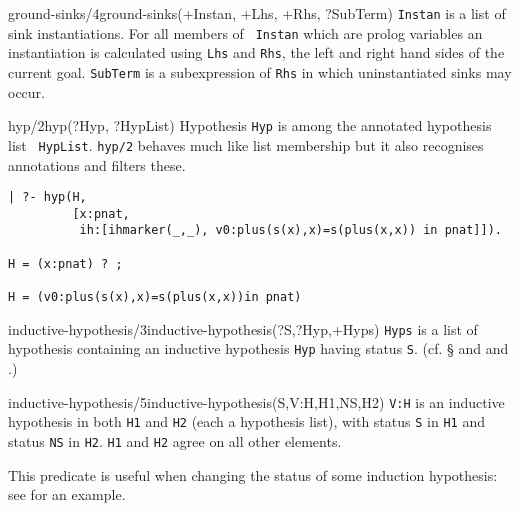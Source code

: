 \begin{predicate}{ground-sinks/4}{ground-sinks(+Instan, +Lhs, +Rhs, ?SubTerm)}%
{\tt Instan} is a list of sink instantiations. For all members of {\tt
Instan} which are prolog variables an instantiation is calculated
using {\tt Lhs} and {\tt Rhs}, the left and right hand sides of the
current goal. {\tt SubTerm} is a subexpression of {\tt Rhs} in which
uninstantiated sinks may occur.
\end{predicate}

\begin{predicate}{hyp/2}{hyp(?Hyp, ?HypList)}%
Hypothesis {\tt Hyp} is among the annotated hypothesis list {\tt
HypList}.  {\tt hyp/2} behaves much like list membership but it also
recognises annotations and filters these.  

\begin{ex}
\begin{verbatim}
| ?- hyp(H,
         [x:pnat,
          ih:[ihmarker(_,_), v0:plus(s(x),x)=s(plus(x,x)) in pnat]]).

H = (x:pnat) ? ;

H = (v0:plus(s(x),x)=s(plus(x,x))in pnat)
\end{verbatim}
\end{ex}
\end{predicate}

\begin{predicate}{inductive-hypothesis/3}{inductive-hypothesis(?S,?Hyp,+Hyps)}%
{\tt Hyps} is a list of hypothesis containing an inductive hypothesis
{\tt Hyp} 
having status {\tt S}. (cf. \S{} and
 and .)
\end{predicate}

\begin{predicate}{inductive-hypothesis/5}{inductive-hypothesis(S,V:H,H1,NS,H2)}%
{\tt V:H} is an inductive hypothesis in both {\tt H1} and {\tt H2}
(each a hypothesis list), with status {\tt S} in {\tt H1} and status
{\tt NS} in {\tt H2}.  {\tt H1} and {\tt H2} agree on all other
elements.

This predicate is useful when changing the status of some induction
hypothesis: see  for an example.
\end{predicate}


